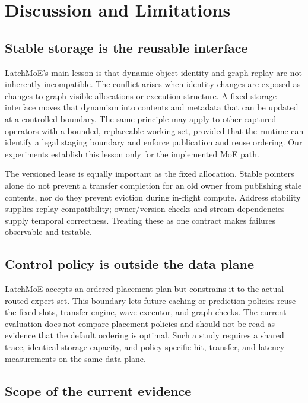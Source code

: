\section{Discussion and Limitations}
\label{sec:discussion}

\subsection{Stable storage is the reusable interface}

LatchMoE's main lesson is that dynamic object identity and graph replay are not
inherently incompatible. The conflict arises when identity changes are exposed
as changes to graph-visible allocations or execution structure. A fixed
storage interface moves that dynamism into contents and metadata that can be
updated at a controlled boundary. The same principle may apply to other
captured operators with a bounded, replaceable working set, provided that the
runtime can identify a legal staging boundary and enforce publication and
reuse ordering. Our experiments establish this lesson only for the implemented
MoE path.

The versioned lease is equally important as the fixed allocation. Stable
pointers alone do not prevent a transfer completion for an old owner from
publishing stale contents, nor do they prevent eviction during in-flight
compute. Address stability supplies replay compatibility; owner/version checks
and stream dependencies supply temporal correctness. Treating these as one
contract makes failures observable and testable.

\subsection{Control policy is outside the data plane}

LatchMoE accepts an ordered placement plan but constrains it to the actual
routed expert set. This boundary lets future caching or prediction policies
reuse the fixed slots, transfer engine, wave executor, and graph checks. The
current evaluation does not compare placement policies and should not be read
as evidence that the default ordering is optimal. Such a study requires a
shared trace, identical storage capacity, and policy-specific hit, transfer,
and latency measurements on the same data plane.

\subsection{Scope of the current evidence}

